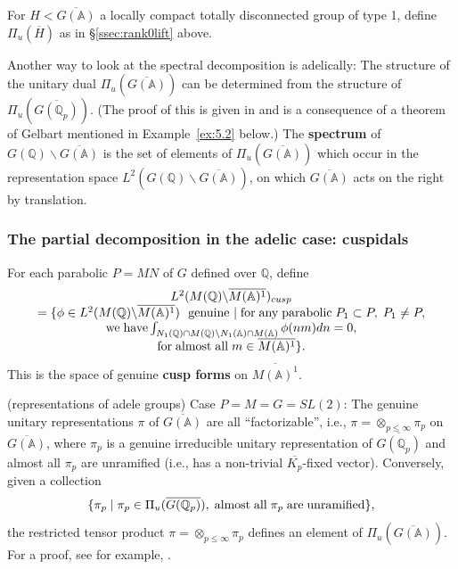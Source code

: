 For $H<\overline{G({\mathbb{A}})}$ a locally
compact totally disconnected group of
type 1, define $\Pi_u(\overline{H})$ as in \S\ref{ssec:rank0lift} above.

Another way to look at the spectral decomposition
is adelically: The structure of the
unitary dual $\Pi_u(\overline{G({\mathbb{A}})})$ can be determined from the
structure of $\Pi_u(\overline{G({\mathbb{Q}}_p)})$.
(The proof of this is given in
\cite{Ge2} and is a consequence of a theorem of Gelbart
mentioned in Example~\ref{ex:5.2} below.) The {\bf
spectrum} of $G({\mathbb{Q}} )\backslash \overline{G({\mathbb{A}})}$ is the set of
elements of $\Pi_u(\overline{G({\mathbb{A}})})$
which occur in the representation
space $L^2(G({{\mathbb{Q}}} )\backslash \overline{G({\mathbb{A}})})$, on which
$\overline{G({\mathbb{A}})}$ acts on the right by translation.

\subsubsection{The partial decomposition in the adelic case: cuspidals}\label{sssec:cuspidals}

For each parabolic $P=MN$ of $G$ defined over ${\mathbb{Q}}$, define 
\begin{equation}\label{eq:5.1}
\begin{array}{c}
L^2(M({\mathbb{Q}})\backslash \overline{M({\mathbb{A}})^1})_{cusp} \\ 
=\{\phi \in L^2(M({{\mathbb{Q}}})\backslash \overline{M({\mathbb{A}})^1})
\ {\rm \ genuine\ }|\;{\rm for\;any\;parabolic}\;
P_1\subset P,\;P_1\neq P, \\ 
{\rm we\;have}
\int_{N_1({\mathbb{Q}})\cap M({\mathbb{Q}})\backslash
N_1({\mathbb{A}})\cap M({\mathbb{A}})}\phi (nm)dn=0, \\ 
{\rm for\;almost\;all}\;m\in \overline{M({\mathbb{A}})^1}\}.
\end{array}
\end{equation}
This is the space of genuine {\bf cusp forms} on
$\overline{M({\mathbb{A}})^1}$.

\begin{example}\label{ex:5.2}
(representations of adele groups) {\sf Case} $P=M=G=SL(2)$:
The genuine unitary representations $\pi $ of
$\overline{G({{\mathbb{A}}})}$ are all
``factorizable'', i.e.,
$\pi =\otimes _{p\leq \infty}\pi _p$ on
$\overline{G({{\mathbb{A}}})}$, where
$\pi _p$ is a genuine irreducible unitary representation of
$\overline{G({\mathbb{Q}}_p)}$ and almost all $\pi _p$
are unramified (i.e., has a non-trivial
$\overline{K_p}$-fixed vector). Conversely, given a collection 
\[
\{\pi _p\;|\;\pi _p\in \Pi _u(\overline{G({\mathbb{Q}}_p)}),
\;{\rm almost\;all}\;\pi _p\;{\rm are\;unramified}\},
\]
the restricted tensor product
$\pi =\otimes _{p\leq \infty}\pi _p$
defines an element of $\Pi _u(\overline{G({\mathbb{A}})})$. For a proof,
see for example, \cite[\S 3]{Ge2}.

\end{example}

